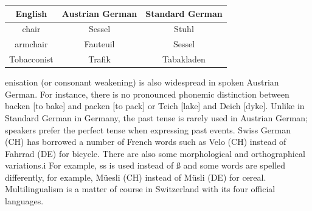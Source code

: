\documentclass[]{../metanetpaper}
\begin{document}
\begin{tabular}{ccc}
\hline \textbf{English} & \textbf{Austrian German} & \textbf{Standard German} \\ 
\hline chair & Sessel & Stuhl \\ 
\hline armchair & Fauteuil & Sessel \\ 
\hline Tobacconist & Trafik & Tabakladen \\
\hline
\end{tabular} 
enisation (or consonant weakening) is also widespread in spoken Austrian German. For instance, there is no pronounced phonemic distinction between backen [to bake] and packen [to pack] or Teich [lake] and Deich [dyke]. Unlike in Standard German in Germany, the past tense is rarely used in Austrian German; speakers prefer the perfect tense when expressing past events. 
Swiss German (CH) has borrowed a number of French words such as Velo (CH) instead of Fahrrad (DE) for bicycle. There are also some morphological and orthographical variations.i For example, ss is used instead of ß and some words are spelled differently, for example, Müesli (CH) instead of Müsli (DE) for cereal. Multilingualism is a matter of course in Switzerland with its four official languages.
\end{document}
